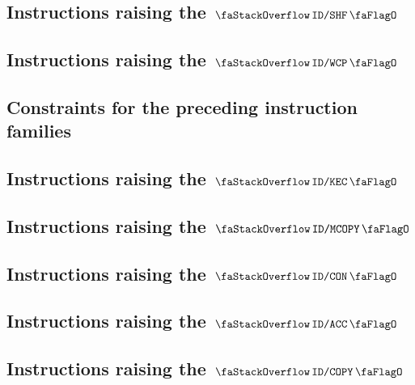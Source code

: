 \subsection{Instructions raising the $\stackDecShfFlag$           \lispDone{}}   \label{hub: instruction handling: shf}                    
\subsection{Instructions raising the $\stackDecWcpFlag$           \lispDone{}}   \label{hub: instruction handling: wcp}                    
\subsection{Constraints for the preceding instruction families    \lispDone{}}   \label{hub: instruction handling: stateless constraints}  
\subsection{Instructions raising the $\stackDecKecFlag$           \lispDone{}}   \label{hub: instruction handling: kec}                    
\subsection{Instructions raising the $\stackDecMcopyFlag$         }   \label{hub: instruction handling: mcopy}                   %
\subsection{Instructions raising the $\stackDecConFlag$           \lispDone{}}   \label{hub: instruction handling: con}                    
\subsection{Instructions raising the $\stackDecAccFlag$           \lispDone{}}   \label{hub: instruction handling: acc}                    
\subsection{Instructions raising the $\stackDecCopyFlag$          \lispDone{}}   \label{hub: instruction handling: copy}                   
